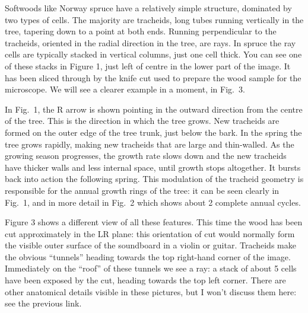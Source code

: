 
  Softwoods like Norway spruce have a relatively simple structure, dominated by 
  two types of cells. The majority are tracheids, long tubes running vertically 
  in the tree, tapering down to a point at both ends. Running perpendicular to 
  the tracheids, oriented in the radial direction in the tree, are rays. In 
  spruce the ray cells are typically stacked in vertical columns, just one cell 
  thick. You can see one of these stacks in Figure 1, just left of centre in 
  the lower part of the image. It has been sliced through by the knife cut used 
  to prepare the wood sample for the microscope. We will see a clearer example 
  in a moment, in Fig.\ 3. 

  In Fig.\ 1, the R arrow is shown pointing in the outward direction from the 
  centre of the tree. This is the direction in which the tree grows. New 
  tracheids are formed on the outer edge of the tree trunk, just below the 
  bark. In the spring the tree grows rapidly, making new tracheids that are 
  large and thin-walled. As the growing season progresses, the growth rate 
  slows down and the new tracheids have thicker walls and less internal space, 
  until growth stops altogether. It bursts back into action the following 
  spring. This modulation of the tracheid geometry is responsible for the 
  annual growth rings of the tree: it can be seen clearly in Fig.\ 1, and in 
  more detail in Fig.\ 2 which shows about 2 complete annual cycles. 


  Figure 3 shows a different view of all these features. This time the wood has 
  been cut approximately in the LR plane: this orientation of cut would 
  normally form the visible outer surface of the soundboard in a violin or 
  guitar. Tracheids make the obvious “tunnels” heading towards the top 
  right-hand corner of the image. Immediately on the ``roof'' of these tunnels 
  we see a ray: a stack of about 5 cells have been exposed by the cut, heading 
  towards the top left corner. There are other anatomical details visible in 
  these pictures, but I won't discuss them here: see the previous link. 


